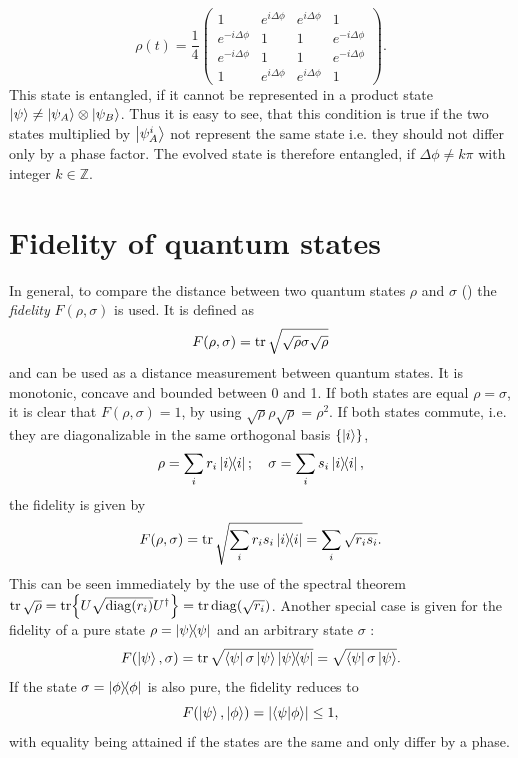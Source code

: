 \begin{equation}
  \rho(t) = \frac{1}{4}
  \begin{pmatrix}
    1 & e^{i\Delta\phi}  & e^{i\Delta\phi} & 1 \\
    e^{-i\Delta\phi} & 1 & 1  & e^{-i\Delta\phi} \\
    e^{-i\Delta\phi} & 1  & 1 & e^{-i\Delta\phi} \\
    1 & e^{i\Delta\phi} & e^{i\Delta\phi} & 1
  \end{pmatrix}.
\end{equation}
This state is entangled, if it cannot be represented in a product state $\ket{\psi} \neq \ket{\psi_A}\otimes\ket{\psi_B}$. Thus it is easy to see, that this condition is true if the two states multiplied by $\ket{\psi_A^i}$ not represent the same state i.e. they should not differ only by a phase factor.
The evolved state is therefore entangled, if $\Delta \phi \neq k\pi$ with integer $k \in \mathbb{Z}$.



\section{Fidelity of quantum states}
In general, to compare the distance between two quantum states $\rho$ and $\sigma$ () the \emph{fidelity} $F(\rho, \sigma)$ is used. It is defined as \cite[p. 409-412]{Nielsen_2010} 
\begin{equation}
  F(\rho, \sigma) = \tr \sqrt{\sqrt{\rho} \sigma \sqrt{\rho}}
\end{equation} 
and can be used as a distance measurement between quantum states. It is monotonic, concave and bounded between 0 and 1. If both states are equal $\rho = \sigma$, it is clear that $F(\rho, \sigma) = 1$, by using $\sqrt{\rho}\rho\sqrt{\rho} = \rho^2$. If both states commute, i.e. they are diagonalizable in the same orthogonal basis $\{ \ket{i} \}$, 
\begin{equation*}
  \rho = \sum_i r_i \ketbra{i}; \quad \sigma = \sum_i s_i \ketbra{i},
\end{equation*}
the fidelity is given by \cite[p. 409]{Nielsen_2010}
\begin{equation*}
  F(\rho, \sigma) = \tr \sqrt{\sum_i r_i s_i \ketbra{i}} = \sum_i \sqrt{r_i s_i}.
\end{equation*}
This can be seen immediately by the use of the spectral theorem $\tr \sqrt{\rho} = \tr{U \sqrt{\mathrm{diag}(r_i)} U^\dagger} = \tr \operatorname{diag}(\sqrt{r_i})$.
Another special case is given for the fidelity of a pure state $\rho=\ketbra{\psi}$ and an arbitrary state $\sigma$ \cite[p. 409]{Nielsen_2010}:
\begin{equation*}
  F(\ket{\psi}, \sigma) = \tr \sqrt{\bra{\psi}\sigma\ket{\psi} \ketbra{\psi}} = \sqrt{\bra{\psi}\sigma\ket{\psi}}.
\end{equation*}
If the state $\sigma = \ketbra{\phi}$ is also pure, the fidelity reduces to
\begin{equation*}
  F(\ket{\psi}, \ket{\phi}) = \left\lvert\braket{\psi}{\phi}\right\rvert \le 1,
\end{equation*}
with equality being attained if the states are the same and only differ by a phase. 

